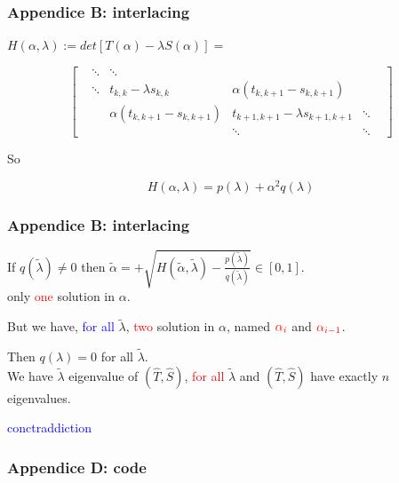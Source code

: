 \documentclass{beamer}
\theoremstyle{definition} \newtheorem{de}{Def}
\theoremstyle{remark} \newtheorem{os}[de]{Remark}
\theoremstyle{plain} \newtheorem{te}[de]{Teo}
\theoremstyle{plain} \newtheorem{co}[de]{Cor}
\theoremstyle{plain} \newtheorem{pr}[de]{Prop}
\theoremstyle{plain} \newtheorem{lem}[de]{Lemm}
\theoremstyle{remark} \newtheorem{rem}[de]{Remark}
\begin{document}
\begin{frame}
  \frametitle{Appendice B: interlacing}

  $H(\alpha,\lambda) := det[T(\alpha)-\lambda S(\alpha)] =$

  \begin{equation*}
    \begin{bmatrix}  
     & \ddots & \ddots & & & \\
      & \ddots & t_{k,k}-\lambda s_{k,k} & \alpha(t_{k,k+1}-s_{k,k+1}) & & \\
      & & \alpha(t_{k,k+1}-s_{k,k+1}) & t_{k+1,k+1}-\lambda s_{k+1,k+1} & \ddots \\
      & & & \ddots & \ddots
    \end{bmatrix}
  \end{equation*}


\pause

 So 

  \begin{equation*}
    H(\alpha,\lambda) = p(\lambda) + \alpha^2 q(\lambda)
  \end{equation*}

\end{frame}

\begin{frame}
  \frametitle{Appendice B: interlacing}

  If $q(\tilde\lambda)\ne 0$ then $\tilde\alpha= + \sqrt{H(\tilde\alpha,\tilde\lambda)-\frac{p(\tilde\lambda)}{q(\tilde\lambda)}}\in[0,1]$.\\
  only \textcolor{red}{one} solution in $\alpha$.

  \pause

  But we have, \textcolor{blue}{for all} $\tilde\lambda$, \textcolor{red}{two} solution in $\alpha$, named $\textcolor{red}{\alpha_i}$ and $\textcolor{red}{\alpha_{i-1}}$. 

  \pause

  Then $q(\lambda)=0$ for all $\tilde\lambda$. \\
  We have $\tilde\lambda$ eigenvalue of $(\hat T, \hat S)$, \textcolor{red}{for all} $\tilde\lambda$ and $(\hat T, \hat S)$ have exactly $n$ eigenvalues.

  \pause

  \textcolor{blue}{conctraddiction}
 

  \hyperlink{BeforeInterlacing}{}

\end{frame}


\begin{frame}[label=CodeIf]
  \frametitle{Appendice D: code}
  \hyperlink{BeforeCodeIf}{}
\end{frame}


\begin{frame}
  
  
\end{frame}




\end{document}
